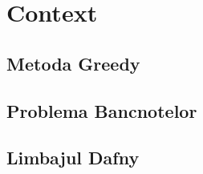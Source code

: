 \chapter{Context} 

\section{Metoda Greedy} 
\section{Problema Bancnotelor} 
\section{Limbajul Dafny} 
